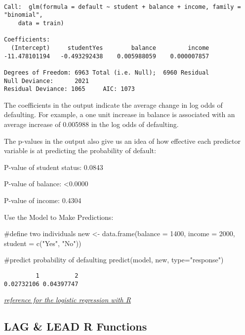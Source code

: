 \documentclass[
  letterpaper,
  DIV=11,
  numbers=noendperiod]{scrreprt}
\newenvironment{Shaded}{\begin{snugshade}}{\end{snugshade}}
\newcommand{\AttributeTok}[1]{\textcolor[rgb]{0.40,0.45,0.13}{#1}}
\newcommand{\CommentTok}[1]{\textcolor[rgb]{0.37,0.37,0.37}{#1}}
\newcommand{\DecValTok}[1]{\textcolor[rgb]{0.68,0.00,0.00}{#1}}
\newcommand{\FunctionTok}[1]{\textcolor[rgb]{0.28,0.35,0.67}{#1}}
\newcommand{\NormalTok}[1]{\textcolor[rgb]{0.00,0.23,0.31}{#1}}
\newcommand{\OtherTok}[1]{\textcolor[rgb]{0.00,0.23,0.31}{#1}}
\newcommand{\StringTok}[1]{\textcolor[rgb]{0.13,0.47,0.30}{#1}}
\begin{document}
\begin{verbatim}

Call:  glm(formula = default ~ student + balance + income, family = "binomial", 
    data = train)

Coefficients:
  (Intercept)     studentYes        balance         income  
-11.478101194   -0.493292438    0.005988059    0.000007857  

Degrees of Freedom: 6963 Total (i.e. Null);  6960 Residual
Null Deviance:      2021 
Residual Deviance: 1065     AIC: 1073
\end{verbatim}

The coefficients in the output indicate the average change in log odds
of defaulting. For example, a one unit increase in balance is associated
with an average increase of 0.005988 in the log odds of defaulting.

The p-values in the output also give us an idea of how effective each
predictor variable is at predicting the probability of default:

P-value of student status: 0.0843

P-value of balance: \textless0.0000

P-value of income: 0.4304

Use the Model to Make Predictions:

\begin{Shaded}
\begin{Highlighting}[]
\CommentTok{\#define two individuals}
\NormalTok{new }\OtherTok{\textless{}{-}} \FunctionTok{data.frame}\NormalTok{(}\AttributeTok{balance =} \DecValTok{1400}\NormalTok{, }\AttributeTok{income =} \DecValTok{2000}\NormalTok{, }\AttributeTok{student =} \FunctionTok{c}\NormalTok{(}\StringTok{"Yes"}\NormalTok{, }\StringTok{"No"}\NormalTok{))}

\CommentTok{\#predict probability of defaulting}
\FunctionTok{predict}\NormalTok{(model, new, }\AttributeTok{type=}\StringTok{"response"}\NormalTok{)}
\end{Highlighting}
\end{Shaded}

\begin{verbatim}
         1          2 
0.02732106 0.04397747 
\end{verbatim}

\href{https://www.statology.org/logistic-regression-in-r/}{\emph{reference
for the logistic regression with R}}

\hypertarget{lag-lead-r-functions}{%
\subsection{LAG \& LEAD R Functions}\label{lag-lead-r-functions}}
\end{document}
